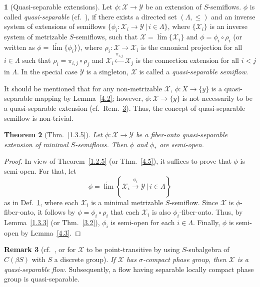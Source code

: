 \documentclass[12pt,final,3p,times]{elsarticle}
\newtheorem{sthm}{Theorem}[subsection]
\theoremstyle{definition}
\newtheorem{srem}[sthm]{Remark}
\newtheorem{sse}[sthm]{}
\numberwithin{equation}{section}
\begin{document}
\begin{sse}[Quasi-separable extensions]\label{5.2.1}
Let $\phi\colon \mathscr{X}\rightarrow \mathscr{Y}$ be an extension of $S$-semiflows. $\phi$ is called \textit{quasi-separable} (cf.~\cite{E69, K71, K72, E73}), if there exists a directed set $(\Lambda,\le)$ and an inverse system of extensions of semiflows
$\{\phi_i\colon\mathscr{X}_i\rightarrow\mathscr{Y}\,|\,i\in\Lambda\}$,
where $\{\mathscr{X}_i\}$ is an inverse system of metrizable $S$-semiflows, such that $\mathscr{X}=\underleftarrow{\lim}\{\mathscr{X}_i\}$ and $\phi=\phi_i\circ\rho_i$ (or written as $\phi=\underleftarrow{\lim}\{\phi_i\}$), where $\rho_i\colon \mathscr{X}\rightarrow \mathscr{X}_i$ is the canonical projection for all $i\in\Lambda$ such that $\rho_i=\pi_{i,j}\circ\rho_j$ and $\mathscr{X}_i\xleftarrow{\pi_{i,j}}\mathscr{X}_j$ is the connection extension for all $i<j$ in $\Lambda$. In the special case $\mathscr{Y}$ is a singleton, $\mathscr{X}$ is called a \textit{quasi-separable semiflow}.
\end{sse}

It should be mentioned that for any non-metrizable $\mathscr{X}$, $\phi\colon X\rightarrow\{y\}$ is a quasi-separable mapping by Lemma~\ref{4.2}; however, $\phi\colon\mathscr{X}\rightarrow\{y\}$ is not necessarily to be a quasi-separable extension (cf.~Rem.~\ref{5.2.3}). Thus, the concept of quasi-separable semiflow is non-trivial.

\begin{sthm}[Thm.~\ref{1.3.5}]\label{5.2.2}
Let $\phi\colon\mathscr{X}\rightarrow\mathscr{Y}$ be a fiber-onto quasi-separable extension of minimal $S$-semiflows. Then $\phi$ and $\phi_*$ are semi-open.
\end{sthm}

\begin{proof}
In view of Theorem~\ref{1.2.5} (or Thm.~\ref{4.5}), it suffices to prove that $\phi$ is semi-open. For that, let
$$\phi=\underleftarrow{\lim}\left\{\mathscr{X}_i\xrightarrow{\phi_i}\mathscr{Y}\,|\,i\in\Lambda\right\}$$
as in Def.~\ref{5.2.1}, where each $\mathscr{X}_i$ is a minimal metrizable $S$-semiflow.
Since $\mathscr{X}$ is $\phi$-fiber-onto, it follows by $\phi=\phi_i\circ\rho_i$ that each $\mathscr{X}_i$ is also $\phi_i$-fiber-onto. Thus, by Lemma~\ref{1.3.3} (or Thm.~\ref{3.2}), $\phi_i$ is semi-open for each $i\in\Lambda$. Finally, $\phi$ is semi-open by Lemma~\ref{4.3}.
\end{proof}

\begin{srem}[{cf.~\cite{E68, K72}, \cite[Lem.~2.1]{K71} or \cite[Thm.~I.1.7]{Wo} for $\mathscr{X}$ to be point-transitive by using $S$-subalgebra of $C(\beta S)$ with $S$ a discrete group}]\label{5.2.3}
\textit{If $\mathscr{X}$ has $\sigma$-compact phase group, then
$\mathscr{X}$ is a quasi-separable flow.} Subsequently, a flow having separable locally compact phase group is quasi-separable.
\end{srem}
\end{document}
